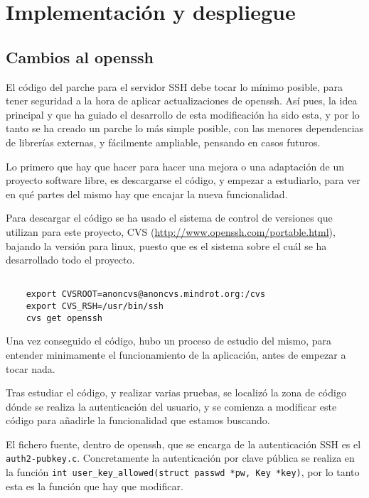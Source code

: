 
\chapter{Implementación y despliegue}
    \label{implementacion}
    \section{Cambios al openssh}

    El código del parche para el servidor SSH debe tocar lo mínimo
    posible, para tener seguridad a la hora de aplicar actualizaciones
    de openssh. Así pues, la idea principal y que ha guiado el
    desarrollo de esta modificación ha sido esta, y por lo tanto se ha
    creado un parche lo más simple posible, con las menores
    dependencias de librerías externas, y fácilmente ampliable,
    pensando en casos futuros.

    Lo primero que hay que hacer para hacer una mejora o una adaptación de
    un proyecto software libre, es descargarse el código, y empezar a
    estudiarlo, para ver en qué partes del mismo hay que encajar la nueva
    funcionalidad.

    Para descargar el código se ha usado el sistema de control de versiones
    que utilizan para este proyecto, CVS
    (\url{http://www.openssh.com/portable.html}), bajando la versión para
    linux, puesto que es el sistema sobre el cuál se ha desarrollado todo
    el proyecto.
    
    \begin{verbatim}

    export CVSROOT=anoncvs@anoncvs.mindrot.org:/cvs
    export CVS_RSH=/usr/bin/ssh
    cvs get openssh

    \end{verbatim}

    Una vez conseguido el código, hubo un proceso de estudio del mismo,
    para entender minimamente el funcionamiento de la aplicación, antes de
    empezar a tocar nada.

    Tras estudiar el código, y realizar varias pruebas, se localizó la zona
    de código dónde se realiza la autenticación del usuario, y se comienza
    a modificar este código para añadirle la funcionalidad que estamos
    buscando.

    El fichero fuente, dentro de openssh, que se encarga de la
    autenticación SSH es el \texttt{auth2-pubkey.c}. Concretamente la
    autenticación por clave pública se realiza en la función
    \texttt{int user\_key\_allowed(struct passwd *pw, Key *key)}, por lo
    tanto esta es la función que hay que modificar.

